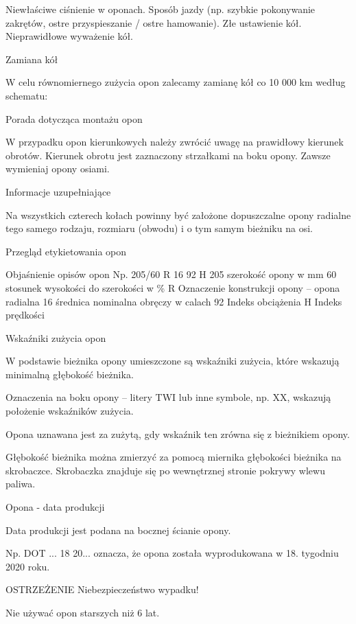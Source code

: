 \begin{itemizeTriangle}
	\itemTriangle Niewłaściwe ciśnienie w oponach.
	\itemTriangle Sposób jazdy (np. szybkie pokonywanie zakrętów, ostre przyspieszanie / ostre hamowanie).
	\itemTriangle Złe ustawienie kół.
	\itemTriangle Nieprawidłowe wyważenie kół.
\end{itemizeTriangle}

Zamiana kół

W celu równomiernego zużycia opon zalecamy zamianę kół co 10 000 km według schematu:

Porada dotycząca montażu opon
\begin{itemizeArrow}
	\itemArrow W przypadku opon kierunkowych należy zwrócić uwagę na prawidłowy kierunek obrotów. Kierunek obrotu jest zaznaczony strzałkami na boku opony.
	\itemArrow Zawsze wymieniaj opony osiami.
\end{itemizeArrow}

Informacje uzupełniające

Na wszystkich czterech kołach powinny być założone dopuszczalne opony radialne tego samego rodzaju, rozmiaru (obwodu) i o tym samym bieżniku na osi.

Przegląd etykietowania opon

Objaśnienie opisów opon
Np. 205/60 R 16 92 H
205	szerokość opony w mm
60	stosunek wysokości do szerokości w \%
R Oznaczenie konstrukcji opony – opona radialna
16	średnica nominalna obręczy w calach
92	Indeks obciążenia
H	Indeks prędkości

Wskaźniki zużycia opon


W podstawie bieżnika opony umieszczone są wskaźniki zużycia, które wskazują minimalną głębokość bieżnika.

Oznaczenia na boku opony – litery TWI lub inne symbole, np. XX, wskazują położenie wskaźników zużycia.

Opona uznawana jest za zużytą, gdy wskaźnik ten zrówna się z bieżnikiem opony.

Głębokość bieżnika można zmierzyć za pomocą miernika głębokości bieżnika na skrobaczce. Skrobaczka znajduje się po wewnętrznej stronie pokrywy wlewu paliwa.

Opona - data produkcji

Data produkcji jest podana na bocznej ścianie opony.

Np. DOT ... 18 20... oznacza, że opona została wyprodukowana w 18. tygodniu 2020 roku.

OSTRZEŻENIE
Niebezpieczeństwo wypadku!
\begin{itemizeTriangle}
	\itemTriangle Nie używać opon starszych niż 6 lat.
\end{itemizeTriangle}

